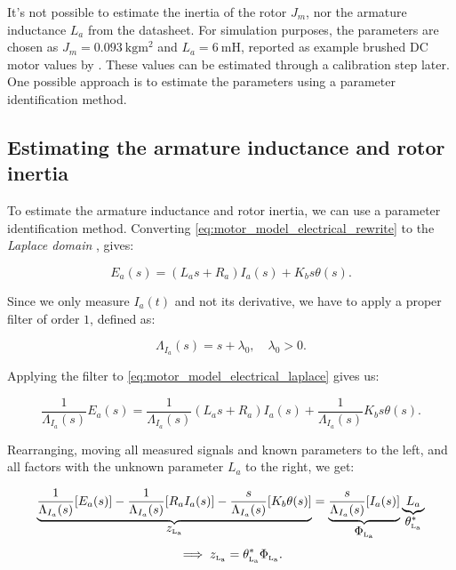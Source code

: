 It's not possible to estimate the inertia of the rotor $J_m$, nor the armature inductance $L_a$ from the datasheet. For simulation purposes, the parameters are chosen as $J_m=\SI{0.093}{\kilogram \metre\squared}$ and $L_a=\SI{6}{\milli\henry}$, reported as example brushed DC motor values by \textcite{rahmanMathematicalModelBrushed2021}. These values can be estimated through a calibration step later. One possible approach is to estimate the parameters using a parameter identification method.

\subsection{Estimating the armature inductance and rotor inertia}%
\label{subsec:est_armature_inductance}

To estimate the armature inductance and rotor inertia, we can use a parameter identification method. Converting \cref{eq:motor_model_electrical_rewrite} to the \textit{Laplace domain} \parencite{LaplaceTransformOverview}, gives:

\begin{equation}
    \label{eq:motor_model_electrical_laplace}
    E_a(s) = (L_a s + R_a) I_a(s) + K_b s \theta(s).
\end{equation}

Since we only measure $I_a(t)$ and not its derivative, we have to apply a proper filter of order $1$, defined as:

\begin{equation}
    \label{eq:filter_current}
    \Lambda_{I_a}(s) = s + \lambda_0, \quad \lambda_0 > 0.
\end{equation}

Applying the filter to \cref{eq:motor_model_electrical_laplace} gives us:

\begin{equation*}
    \frac{1}{\Lambda_{I_a}(s)} E_a(s) = \frac{1}{\Lambda_{I_a}(s)} (L_a s + R_a) I_a(s) + \frac{1}{\Lambda_{I_a}(s)} K_b s \theta(s).
\end{equation*}

Rearranging, moving all measured signals and known parameters to the left, and all factors with the unknown parameter $L_a$ to the right, we get:

\begin{equation}
    \label{eq:motor_model_electrical_filtered}
    \underbrace{\frac{1}{\Lambda_{I_a}(s)} [E_a(s)] - \frac{1}{\Lambda_{I_a}(s)} [R_a I_a(s)] - \frac{s}{\Lambda_{I_a}(s)} [K_b \theta(s)]}_{\textstyle z_{{\scriptscriptstyle\mathrm{L_a}}}} = \underbrace{\frac{s}{\Lambda_{I_a}(s)} [I_a(s)]}_{\textstyle \Phi_{{\scriptscriptstyle\mathrm{L_a}}}} \underbrace{L_a}_{\textstyle \theta^*_{{\scriptscriptstyle\mathrm{L_a}}}}
\end{equation}
\begin{equation*}
    \implies z_{{\scriptscriptstyle\mathrm{L_a}}} = \theta^*_{{\scriptscriptstyle\mathrm{L_a}}} \Phi_{{\scriptscriptstyle\mathrm{L_a}}}.
\end{equation*}

